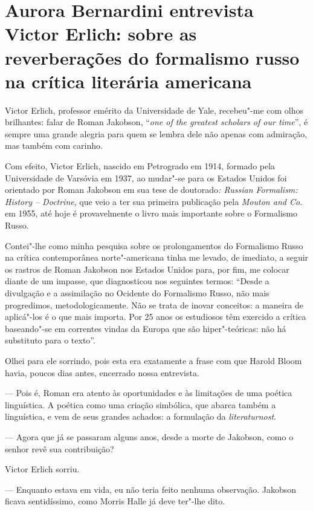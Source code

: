 {\chapter*{Aurora Bernardini entrevista Victor Erlich: sobre as reverberações do formalismo russo na crítica literária americana}


Victor Erlich, professor emérito da Universidade de Yale, recebeu"-me com
olhos brilhantes: falar de Roman Jakobson, ``\emph{one of the greatest
scholars of our time}'', é sempre uma grande alegria para quem se lembra
dele não apenas com admiração, mas também com carinho.

Com efeito, Victor Erlich, nascido em Petrogrado em 1914, formado pela
Universidade de Varsóvia em 1937, ao mudar"-se para os Estados Unidos foi
orientado por Roman Jakobson em sua tese de doutorado\emph{: Russian
Formalism: History -- Doctrine}, que veio a ter sua primeira publicação
pela \emph{Mouton and Co.} em 1955, até hoje é provavelmente o livro
mais importante sobre o Formalismo Russo.

Contei"-lhe como minha pesquisa sobre os prolongamentos do Formalismo
Russo na crítica contemporânea norte"-americana tinha me levado, de
imediato, a seguir os rastros de Roman Jakobson nos Estados Unidos para,
por fim, me colocar diante de um impasse, que diagnosticou nos seguintes
termos: ``Desde a divulgação e a assimilação no Ocidente do Formalismo
Russo, não mais progredimos, metodologicamente. Não se trata de inovar
conceitos: a maneira de aplicá"-los é o que mais importa. Por 25 anos os
estudiosos têm exercido a crítica baseando"-se em correntes vindas da
Europa que são hiper"-teóricas: não há substituto para o texto''.

Olhei para ele sorrindo, pois esta era exatamente a frase com que Harold
Bloom havia, poucos dias antes, encerrado nossa entrevista.

--- Pois é, Roman era atento às oportunidades e às limitações de uma
poética linguística. A poética como uma criação simbólica, que abarca
também a linguística, e vem de seus grandes achados: a formulação da
\emph{literaturnost}.

--- Agora que já se passaram alguns anos, desde a morte de Jakobson, como o
senhor revê sua contribuição?

Victor Erlich sorriu.

--- Enquanto estava em vida, eu não teria feito nenhuma observação.
Jakobson ficava sentidíssimo, como Morris Halle já deve ter"-lhe dito.

}
